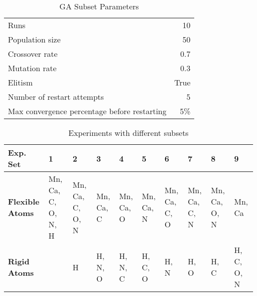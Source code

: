 \begin{table}
	\centering
	\begin{tabular}{ l r }
		\hline
		Runs & 10 \\
		Population size & 50 \\
		Crossover rate & 0.7 \\
		Mutation rate & 0.3 \\
		Elitism & True \\
		Number of restart attempts & 5 \\
		Max convergence percentage before restarting & 5\% \\
		\hline
	\end{tabular}
	\caption{GA Subset Parameters}
	\label{table:subset-parameters}
\end{table}

\begin{table}
	\centering
	\begin{tabular}{ | >{\bfseries}p{2cm} | p{1cm} | p{1cm} | p{1cm} | p{1cm} | p{1cm} | p{1cm} | p{1cm} | p{1cm} | p{1cm} | }
		\hline
		Exp. Set & 1 & 2 & 3 & 4 & 5 & 6 & 7 & 8 & 9 \\ \hline
		Flexible Atoms & Mn, Ca, C, O, N, H & Mn, Ca, C, O, N & Mn, Ca, C & Mn, Ca, O & Mn, Ca, N & Mn, Ca, C, O & Mn, Ca, C, N & Mn, Ca, O, N & Mn, Ca \\ \hline
		Rigid Atoms &  & H & H, N, O & H, N, C & H, C, O & H, N & H, O & H, C & H, C, O, N \\ \hline
	\end{tabular}
	\caption{Experiments with different subsets}
	\label{table:subset-setup}
\end{table}